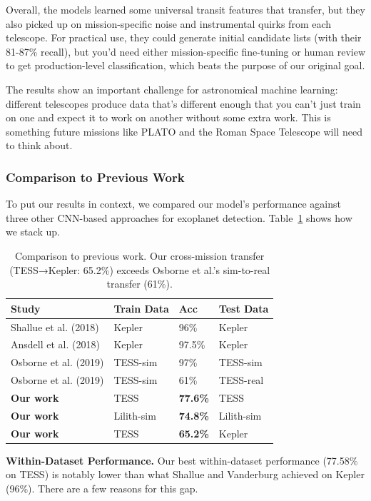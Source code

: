 \documentclass[letterpaper]{article} %
\begin{document}
Overall, the models learned some universal transit features that transfer, but they also picked up on mission-specific noise and instrumental quirks from each telescope. For practical use, they could generate initial candidate lists (with their 81-87\% recall), but you'd need either mission-specific fine-tuning or human review to get production-level classification, which beats the purpose of our original goal.

The results show an important challenge for astronomical machine learning: different telescopes produce data that's different enough that you can't just train on one and expect it to work on another without some extra work. This is something future missions like PLATO and the Roman Space Telescope will need to think about.

\subsubsection{Comparison to Previous Work}

To put our results in context, we compared our model's performance against three other CNN-based approaches for exoplanet detection. Table~\ref{tab:comparison} shows how we stack up.

\begin{table}[H]
\centering
\scriptsize
\begin{tabular}{p{3cm}p{1.5cm}p{1cm}p{2cm}}
\hline
\textbf{Study} & \textbf{Train Data} & \textbf{Acc} & \textbf{Test Data} \\
\hline
Shallue et al. (2018) & Kepler & 96\% & Kepler \\
Ansdell et al. (2018) & Kepler & 97.5\% & Kepler \\
Osborne et al. (2019) & TESS-sim & 97\% & TESS-sim \\
Osborne et al. (2019) & TESS-sim & 61\% & TESS-real \\
\hline
\textbf{Our work} & TESS & \textbf{77.6\%} & TESS \\
\textbf{Our work} & Lilith-sim & \textbf{74.8\%} & Lilith-sim \\
\textbf{Our work} & TESS & \textbf{65.2\%} & Kepler \\
\hline
\end{tabular}
\caption{Comparison to previous work. Our cross-mission transfer (TESS→Kepler: 65.2\%) exceeds Osborne et al.'s sim-to-real transfer (61\%).}
\label{tab:comparison}
\end{table}

\textbf{Within-Dataset Performance.} Our best within-dataset performance (77.58\% on TESS) is notably lower than what Shallue and Vanderburg achieved on Kepler (96\%). There are a few reasons for this gap.
\end{document}
